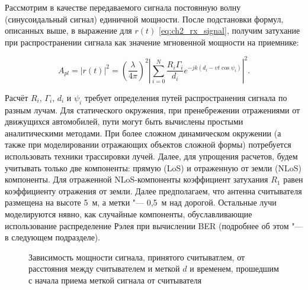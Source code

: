 Рассмотрим в качестве передаваемого сигнала постоянную волну (синусоидальный сигнал) единичной мощности. После подстановки формул, описанных выше, в выражение для $r(t)$ \eqref{eq:ch2_rx_signal}, получим затухание при распространении сигнала как значение мгновенной мощности на приемнике:

\begin{equation}
	A_{pl} = |r(t)|^2 = \left(\frac{\lambda}{4\pi}\right)^2
		\left|\sum\limits_{i=0}^{N} \frac{R_i\Gamma_i}{d_i}
		e^{-jk(d_i-\upsilon t \cos{\psi_i})}\right|^2.
	\label{eq:ch2_pathloss}
\end{equation}

Расчёт $R_i$, $\Gamma_i$, $d_i$ и $\psi_i$ требует определения путей распространения сигнала по разным лучам. Для статического окружения, при пренебрежении отражениями от движущихся автомобилей, пути могут быть вычислены простыми аналитическими методами. При более сложном динамическом окружении (а также при моделировании отражающих объектов сложной формы) потребуется использовать техники трассировки лучей. Далее, для упрощения расчетов, будем учитывать только две компоненты: прямую (LoS) и отраженную от земли (NLoS) компоненты. Для отраженной NLoS-компоненты коэффициент затухания $R_1$ равен коэффициенту отражения от земли. Далее предполагаем, что антенна считывателя размещена на высоте 5~м, а метки "--- 0,5~м над дорогой. Остальные лучи моделируются нявно, как случайные компоненты,  обуславливающие использование распределение Рэлея при вычислении BER (подробнее об этом "--- в следующем подразделе).

\begin{figure}[h]
	\caption[Зависимость мощности сигналов, принятых меток и считывателем, от расстояния и времени]{Зависимость мощности сигнала, принятого считыватлем, от расстояния между считывателем и меткой $d$ и временем, прошедшим с начала приема меткой сигнала от считывателя}
	\label{fig:ch2_rx_power_doppler}
\end{figure}

